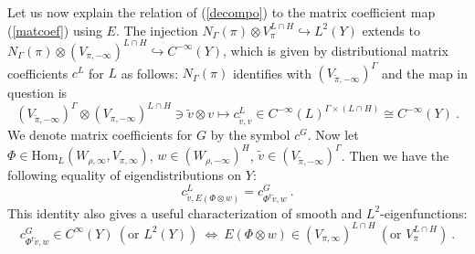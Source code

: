 \documentclass[10]{amsart}
\theoremstyle{remark}
\theoremstyle{definition}
\numberwithin{equation}{section}
\newcommand{\Hom}{\mathrm{Hom}}
\newcommand{\be}{\begin{equation}}
\begin{document}
Let us now explain the relation of (\ref{decompo}) to
the matrix coefficient map (\ref{matcoef}) using $E$. The injection $N_\Gamma(\pi)\otimes V_\pi^{L\cap H}\hookrightarrow L^2(Y)$ extends to 
$N_\Gamma(\pi)\otimes (V_{\pi,-\infty})^{L\cap H}\hookrightarrow C^{-\infty}(Y)$, which is given by distributional matrix coefficients $c^L$ for $L$ as follows:
$N_\Gamma(\pi)$ identifies with $(V_{\tilde\pi,-\infty})^\Gamma$ and the map in question is
$$  (V_{\tilde\pi,-\infty})^\Gamma\otimes (V_{\pi,-\infty})^{L\cap H}\ni \tilde v\otimes v\mapsto c^L_{\tilde v, v}\in C^{-\infty}(L)^{\Gamma\times (L\cap H)}\cong C^{-\infty}(Y)\ .$$
We denote matrix coefficients for $G$ by the symbol $c^G$. Now let $\Phi\in \Hom_L(W_{\rho,\infty},V_{\pi,\infty})$, $w\in (W_{\rho,-\infty})^H$, $\tilde v\in (V_{\tilde\pi,-\infty})^\Gamma$. Then we have the following
equality of eigendistributions on $Y$: 
\be\label{wilhelm} c^L_{\tilde v,E(\Phi\otimes w)} =c^G_{\Phi^t\tilde v, w}\ .
\end{equation}
This identity also gives a useful characterization of smooth and $L^2$-eigenfunctions: 
$$c^G_{\Phi^t\tilde v, w}\in C^\infty(Y)\  (\mbox{or }L^2(Y))\ \Leftrightarrow \ E(\Phi\otimes w)\in (V_{\pi,\infty})^{L\cap H}\  (\mbox{or }V_\pi^{L\cap H})\ .$$
\end{document}
